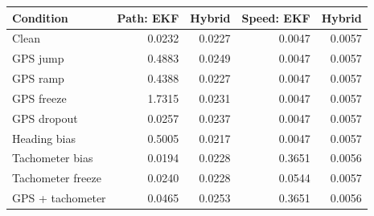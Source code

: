 \begin{tabular}{lrrrr}
\toprule
Condition & Path: EKF & Hybrid & Speed: EKF & Hybrid \\
\midrule
Clean & 0.0232 & 0.0227 & 0.0047 & 0.0057 \\
GPS jump & 0.4883 & 0.0249 & 0.0047 & 0.0057 \\
GPS ramp & 0.4388 & 0.0227 & 0.0047 & 0.0057 \\
GPS freeze & 1.7315 & 0.0231 & 0.0047 & 0.0057 \\
GPS dropout & 0.0257 & 0.0237 & 0.0047 & 0.0057 \\
Heading bias & 0.5005 & 0.0217 & 0.0047 & 0.0057 \\
Tachometer bias & 0.0194 & 0.0228 & 0.3651 & 0.0056 \\
Tachometer freeze & 0.0240 & 0.0228 & 0.0544 & 0.0057 \\
GPS + tachometer & 0.0465 & 0.0253 & 0.3651 & 0.0056 \\
\bottomrule
\end{tabular}
